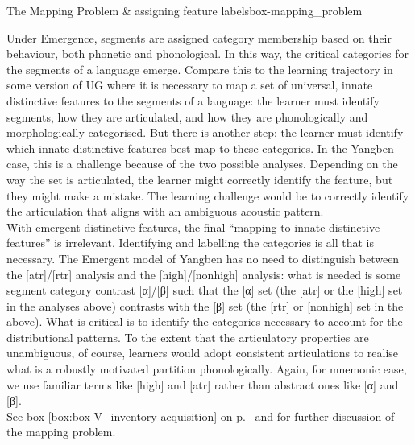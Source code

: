 \begin{dadpbox}{The Mapping Problem \& assigning feature labels}{box-mapping_problem}


Under Emergence, segments are assigned category membership based on their behaviour, both phonetic and phonological. In this way, the critical categories for the segments of a language emerge. Compare this to the learning trajectory in some version of UG where it is necessary to map a set of universal, innate distinctive features to the segments of a language: the learner must identify segments, how they are articulated, and how they are phonologically and morphologically categorised. But there is another step: the learner must identify which innate distinctive features  best map to these categories. In the Yangben  case, this  is a challenge because of the two possible analyses. Depending on the way the set is articulated, the learner might correctly identify the feature, but they might make a mistake. The learning challenge would be to correctly identify the articulation that aligns with  an ambiguous acoustic pattern. \\

With emergent distinctive features, the final ``mapping to innate distinctive features'' is irrelevant.  Identifying and labelling the categories is all that is necessary.  The Emergent model of Yangben has no need to distinguish between the [atr]/[rtr] analysis and the [high]/[nonhigh] analysis: what is needed is some segment category contrast [α]/[β] such that the [α] set (the [atr] or the [high] set in the analyses above) contrasts with the [β] set (the [rtr] or [nonhigh] set in the above). What is critical is to identify the  categories necessary to account for the distributional patterns. To the extent that the articulatory properties are unambiguous, of course, learners would adopt consistent articulations to realise what is a robustly motivated partition phonologically. Again, for mnemonic ease, we use familiar terms like [high] and [atr] rather than abstract ones like [α] and [β].\\

See box \ref{box:box-V_inventory-acquisition} on p.\ \pageref{box:box-V_inventory-acquisition} and \citet{Pulleyblank:2006wccfl, Blaho:2008, Mohanan+:2010, Archangeli+:2015_Frontiers, Archangeli+:2018routledge} for further discussion of the mapping problem. 
\end{dadpbox}

